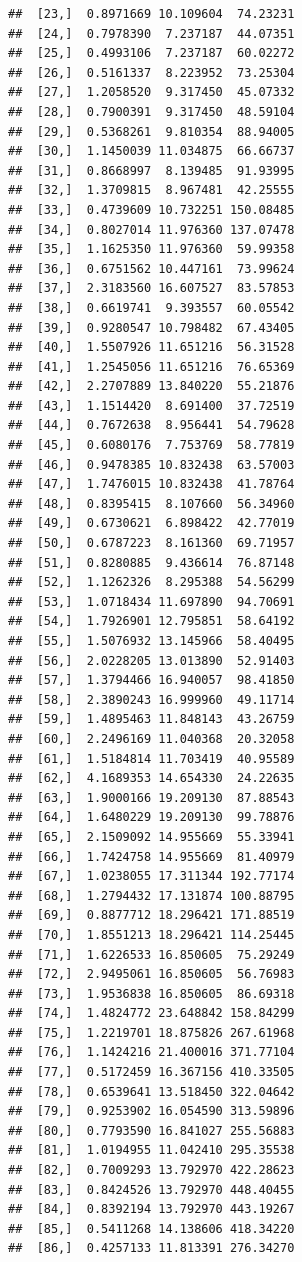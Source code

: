 \documentclass[article]{jss}\usepackage[]{graphicx}\usepackage[]{xcolor}
\makeatletter
\newenvironment{kframe}{%
 \def\at@end@of@kframe{}%
 \ifinner\ifhmode%
  \def\at@end@of@kframe{\end{minipage}}%
  \begin{minipage}{\columnwidth}%
 \fi\fi%
 \def\FrameCommand##1{\hskip\@totalleftmargin \hskip-\fboxsep
 \colorbox{shadecolor}{##1}\hskip-\fboxsep
     \hskip-\linewidth \hskip-\@totalleftmargin \hskip\columnwidth}%
 \MakeFramed {\advance\hsize-\width
   \@totalleftmargin\z@ \linewidth\hsize
   \@setminipage}}%
 {\par\unskip\endMakeFramed%
 \at@end@of@kframe}
\newenvironment{knitrout}{}{} %
\makeatother
\begin{document}
\begin{knitrout}
\begin{kframe}
\begin{verbatim}
##  [23,]  0.8971669 10.109604  74.23231
##  [24,]  0.7978390  7.237187  44.07351
##  [25,]  0.4993106  7.237187  60.02272
##  [26,]  0.5161337  8.223952  73.25304
##  [27,]  1.2058520  9.317450  45.07332
##  [28,]  0.7900391  9.317450  48.59104
##  [29,]  0.5368261  9.810354  88.94005
##  [30,]  1.1450039 11.034875  66.66737
##  [31,]  0.8668997  8.139485  91.93995
##  [32,]  1.3709815  8.967481  42.25555
##  [33,]  0.4739609 10.732251 150.08485
##  [34,]  0.8027014 11.976360 137.07478
##  [35,]  1.1625350 11.976360  59.99358
##  [36,]  0.6751562 10.447161  73.99624
##  [37,]  2.3183560 16.607527  83.57853
##  [38,]  0.6619741  9.393557  60.05542
##  [39,]  0.9280547 10.798482  67.43405
##  [40,]  1.5507926 11.651216  56.31528
##  [41,]  1.2545056 11.651216  76.65369
##  [42,]  2.2707889 13.840220  55.21876
##  [43,]  1.1514420  8.691400  37.72519
##  [44,]  0.7672638  8.956441  54.79628
##  [45,]  0.6080176  7.753769  58.77819
##  [46,]  0.9478385 10.832438  63.57003
##  [47,]  1.7476015 10.832438  41.78764
##  [48,]  0.8395415  8.107660  56.34960
##  [49,]  0.6730621  6.898422  42.77019
##  [50,]  0.6787223  8.161360  69.71957
##  [51,]  0.8280885  9.436614  76.87148
##  [52,]  1.1262326  8.295388  54.56299
##  [53,]  1.0718434 11.697890  94.70691
##  [54,]  1.7926901 12.795851  58.64192
##  [55,]  1.5076932 13.145966  58.40495
##  [56,]  2.0228205 13.013890  52.91403
##  [57,]  1.3794466 16.940057  98.41850
##  [58,]  2.3890243 16.999960  49.11714
##  [59,]  1.4895463 11.848143  43.26759
##  [60,]  2.2496169 11.040368  20.32058
##  [61,]  1.5184814 11.703419  40.95589
##  [62,]  4.1689353 14.654330  24.22635
##  [63,]  1.9000166 19.209130  87.88543
##  [64,]  1.6480229 19.209130  99.78876
##  [65,]  2.1509092 14.955669  55.33941
##  [66,]  1.7424758 14.955669  81.40979
##  [67,]  1.0238055 17.311344 192.77174
##  [68,]  1.2794432 17.131874 100.88795
##  [69,]  0.8877712 18.296421 171.88519
##  [70,]  1.8551213 18.296421 114.25445
##  [71,]  1.6226533 16.850605  75.29249
##  [72,]  2.9495061 16.850605  56.76983
##  [73,]  1.9536838 16.850605  86.69318
##  [74,]  1.4824772 23.648842 158.84299
##  [75,]  1.2219701 18.875826 267.61968
##  [76,]  1.1424216 21.400016 371.77104
##  [77,]  0.5172459 16.367156 410.33505
##  [78,]  0.6539641 13.518450 322.04642
##  [79,]  0.9253902 16.054590 313.59896
##  [80,]  0.7793590 16.841027 255.56883
##  [81,]  1.0194955 11.042410 295.35538
##  [82,]  0.7009293 13.792970 422.28623
##  [83,]  0.8424526 13.792970 448.40455
##  [84,]  0.8392194 13.792970 443.19267
##  [85,]  0.5411268 14.138606 418.34220
##  [86,]  0.4257133 11.813391 276.34270

\end{verbatim}
\end{kframe}
\end{knitrout}
\end{document}
